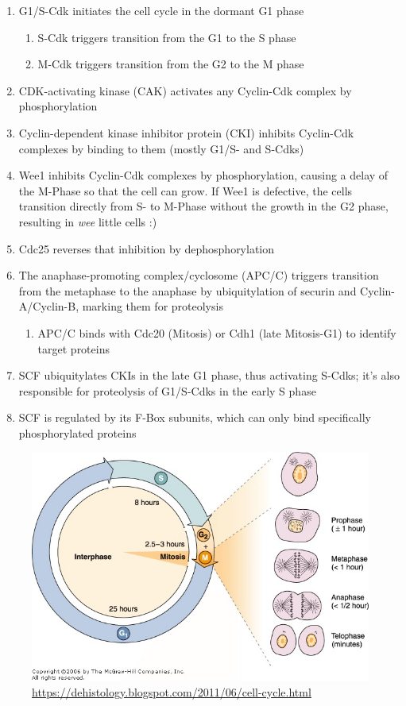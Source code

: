 \documentclass{article}
\begin{document}
	\begin{enumerate}[label=\textbullet]
		\item G1/S-Cdk initiates the cell cycle in the dormant G1 phase 
		\begin{enumerate}[label=\textbullet]
			\item S-Cdk triggers transition from the G1 to the S phase 
			\item M-Cdk triggers transition from the G2 to the M phase 
		\end{enumerate}
		
		\item CDK-activating kinase (CAK) activates any Cyclin-Cdk complex by phosphorylation
		\item Cyclin-dependent kinase inhibitor protein (CKI) inhibits Cyclin-Cdk complexes by binding to them (mostly G1/S- and S-Cdks)
		
		\item Wee1 inhibits Cyclin-Cdk complexes by phosphorylation, causing a delay of the M-Phase so that the cell can grow. If Wee1 is defective, the cells transition directly from S- to M-Phase without the growth in the G2 phase, resulting in \textit{wee} little cells :)
		\item Cdc25 reverses that inhibition by dephosphorylation
		
		\item The anaphase-promoting complex/cyclosome (APC/C) triggers transition from the metaphase to the anaphase by ubiquitylation of securin and Cyclin-A/Cyclin-B, marking them for proteolysis
		\begin{enumerate}[label=\textbullet]
			\item APC/C binds with Cdc20 (Mitosis) or Cdh1 (late Mitosis-G1) to identify target proteins 
		\end{enumerate}
		
		\item SCF ubiquitylates CKIs in the late G1 phase, thus activating S-Cdks; it's also responsible for proteolysis of G1/S-Cdks in the early S phase
		\item SCF is regulated by its F-Box subunits, which can only bind specifically phosphorylated proteins 
	\end{enumerate}

	\begin{figure}[H]
		\centering
		\includegraphics[width=0.8\linewidth]{durations.jpg}
		\caption{\url{https://dehistology.blogspot.com/2011/06/cell-cycle.html}}
	\end{figure}
\end{document}
